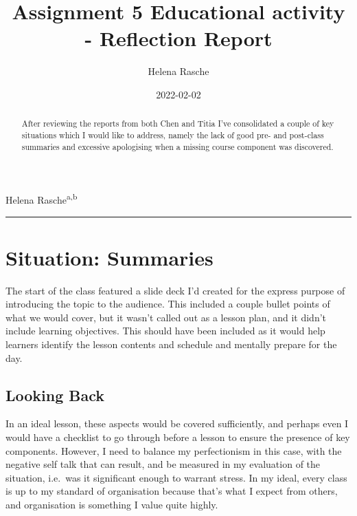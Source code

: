 \documentclass{tufte-handout}
\title[Ex.5]{Assignment 5 Educational activity - Reflection Report}
\author{Helena Rasche}
\date{2022-02-02}
\begin{document}
\fancyhead[CE,CO]{\flushleft \smallcaps{\today}}

\maketitle %

Helena Rasche\textsuperscript{a,b}

\begin{abstract}
\noindent
After reviewing the reports from both Chen and Titia I've consolidated a
couple of key situations which I would like to address, namely the lack
of good pre- and post-class summaries and excessive apologising when a
missing course component was discovered.
\end{abstract}
\noindent\rule{5in}{0.4pt}



\hypertarget{situation-summaries}{%
\section{Situation: Summaries}\label{situation-summaries}}

The start of the class featured a slide deck I'd created for the express
purpose of introducing the topic to the audience. This included a couple
bullet points of what we would cover, but it wasn't called out as a
lesson plan, and it didn't include learning objectives. This should have
been included as it would help learners identify the lesson contents and
schedule and mentally prepare for the day.

\hypertarget{looking-back}{%
\subsection{Looking Back}\label{looking-back}}

In an ideal lesson, these aspects would be covered sufficiently, and
perhaps even I would have a checklist to go through before a lesson to
ensure the presence of key components. However, I need to balance my
perfectionism in this case, with the negative self talk that can result,
and be measured in my evaluation of the situation, i.e.~was it
significant enough to warrant stress. In my ideal, every class is up to
my standard of organisation because that's what I expect from others,
and organisation is something I value quite highly.
\end{document}
